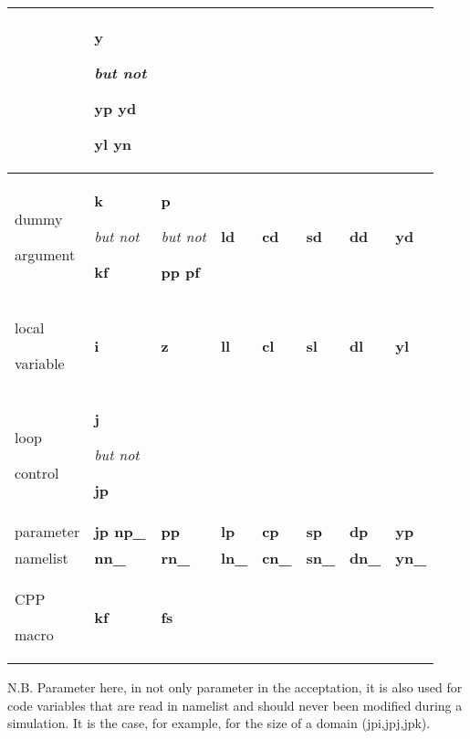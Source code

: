 \documentclass[../main/NEMO_manual]{subfiles}
\begin{document}
\begin{table}[htbp]
\begin{center}
\begin{tabular}{|p{45pt}|p{35pt}|p{45pt}|p{40pt}|p{40pt}|p{40pt}|p{40pt}|p{40pt}|}
      & \textbf{y} \par \textit{but not} \par \textbf{yp yd} \par \textbf{yl yn} \\
      \hline
      dummy \par argument
      & \textbf{k} \par \textit{but not} \par \textbf{kf}
      & \textbf{p} \par \textit{but not} \par \textbf{pp pf}
      & \textbf{ld}
      & \textbf{cd}
      & \textbf{sd}
      & \textbf{dd}
      & \textbf{yd} \\
      \hline
      local \par variable
      & \textbf{i}
      & \textbf{z}
      & \textbf{ll}
      & \textbf{cl}
      & \textbf{sl}
      & \textbf{dl}
      & \textbf{yl} \\
      \hline
      loop \par control
      & \textbf{j} \par \textit{but not} \par \textbf{jp} &&&&&& \\
      \hline
      parameter
      & \textbf{jp np\_}
      & \textbf{pp}
      & \textbf{lp}
      & \textbf{cp}
      & \textbf{sp}
      & \textbf{dp}
      & \textbf{yp} \\
      \hline
      namelist
      & \textbf{nn\_}
      & \textbf{rn\_}
      & \textbf{ln\_}
      & \textbf{cn\_}
      & \textbf{sn\_}
      & \textbf{dn\_}
      & \textbf{yn\_}
      \\
      \hline
      CPP \par macro
      & \textbf{kf}
      & \textbf{fs} \par &&&&& \\
      \hline
    \end{tabular}
    \label{tab:tab1}
  \end{center}
\end{table}

N.B. Parameter here, in not only parameter in the \fortran acceptation,
it is also used for code variables that are read in namelist and should never been modified during a simulation. 
It is the case, for example, for the size of a domain (jpi,jpj,jpk).

\newpage


\biblio

\pindex
\end{document}
